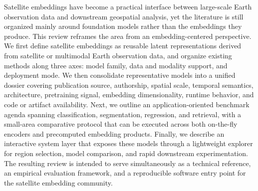 Satellite embeddings have become a practical interface between large-scale Earth observation data and downstream geospatial analysis, yet the literature is still organized mainly around foundation models rather than the embeddings they produce. This review reframes the area from an embedding-centered perspective. We first define satellite embeddings as reusable latent representations derived from satellite or multimodal Earth observation data, and organize existing methods along three axes: model family, data and modality support, and deployment mode. We then consolidate \modelcount{} representative models into a unified dossier covering publication source, authorship, spatial scale, temporal semantics, architecture, pretraining signal, embedding dimensionality, runtime behavior, and code or artifact availability. Next, we outline an application-oriented benchmark agenda spanning classification, segmentation, regression, and retrieval, with a small-area comparative protocol that can be executed across both on-the-fly encoders and precomputed embedding products. Finally, we describe an interactive system layer that exposes these models through a lightweight explorer for region selection, model comparison, and rapid downstream experimentation. The resulting review is intended to serve simultaneously as a technical reference, an empirical evaluation framework, and a reproducible software entry point for the satellite embedding community.
